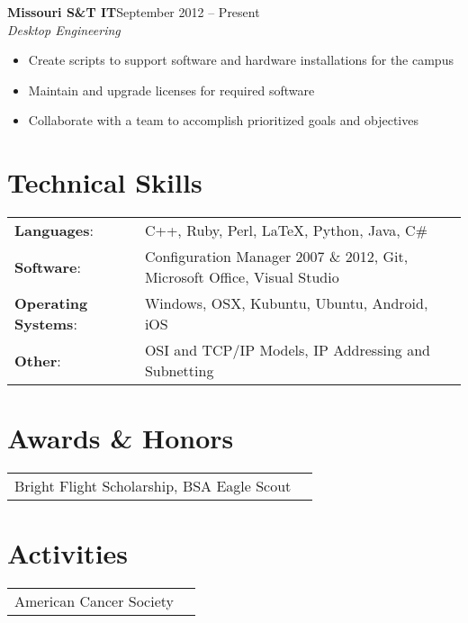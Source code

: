 \documentclass[margin]{res}
\begin{document}
\begin{resume}
    	   \textbf{Missouri S\&T IT}\hfill September 2012 -- Present\\
       \textit{Desktop Engineering}\hfill
       \begin{itemize} \itemsep -1pt  %
         \item Create scripts to support software and hardware installations for the campus
         \item Maintain and upgrade licenses for required software
         \item Collaborate with a team to accomplish prioritized goals and objectives
       \end{itemize}
   


    \section{Technical Skills}
      \begin{tabular}{l p{3.6in}}
        \textbf{Languages}:                   & C++, Ruby, Perl, \LaTeX, Python, Java, C\# \\ [1pt]
        \textbf{Software}:                    & Configuration Manager 2007 \& 2012, Git, Microsoft Office, Visual Studio \\ [1pt]

        \textbf{Operating Systems}:           & Windows, OSX, Kubuntu, Ubuntu, Android, iOS \\ [1pt]
        \textbf{Other}:                       & OSI and TCP/IP Models, IP Addressing and Subnetting \\ [1pt]
      \end{tabular}

	\section{Awards \& Honors} 
      \begin{tabular}{l p{4in}}
        Bright Flight Scholarship, BSA Eagle Scout \\ [1pt]
      \end{tabular}
      
	\section{Activities} 
      \begin{tabular}{l p{4in}}
        American Cancer Society \\ [1pt]
      \end{tabular}
      
  \end{resume} 
\end{document}

